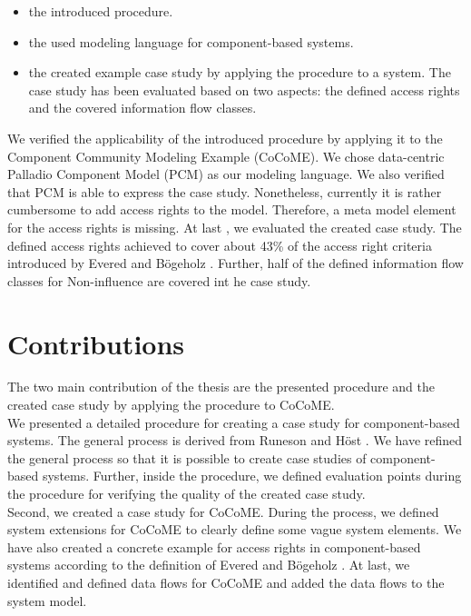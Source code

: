 \begin{itemize}
\item the introduced procedure.
\item the used modeling language for component-based systems.
\item the created example case study by applying the procedure to a system. The case study has been evaluated based on two aspects: the defined access rights and the covered information flow classes.
\end{itemize}
We verified the applicability of the introduced procedure by applying it to the Component Community Modeling Example (CoCoME). We chose data-centric Palladio Component Model (PCM) as our modeling language. We also verified that PCM is able to express the case study. Nonetheless, currently it is rather cumbersome to add access rights to the model. Therefore, a meta model element for the access rights is missing. At last , we evaluated the created case study. The defined access rights achieved to cover about 43\% of the access right criteria introduced by Evered and Bögeholz \cite{CaseStudyAndAccessrigths}. Further, half of the defined information flow classes for Non-influence \cite{Noninfluence} are covered int he case study.

\section{Contributions}
The two main contribution of the thesis are the presented procedure and the created case study by applying the procedure to CoCoME.\\
We presented a detailed procedure for creating a case study for component-based systems. The general process is derived from Runeson and Höst \cite{CaseStudySoftware}. We have refined the general process so that it is possible to create case studies of component-based systems. Further, inside the procedure, we defined evaluation points during the procedure for verifying the quality of the created case study. \\ 
Second, we created a case study for CoCoME. During the process, we defined system extensions for CoCoME to clearly define some vague system elements. We have also created a concrete example for access rights in component-based systems according to the definition of Evered and Bögeholz \cite{CaseStudyAndAccessrigths}. At last, we identified and defined data flows for CoCoME and added the data flows to the system model.
